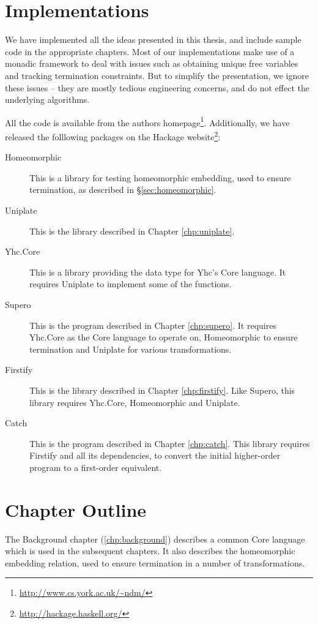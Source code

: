 \section{Implementations}

We have implemented all the ideas presented in this thesis, and include sample code in the appropriate chapters. Most of our implementations make use of a monadic framework to deal with issues such as obtaining unique free variables and tracking termination constraints. But to simplify the presentation, we ignore these issues -- they are mostly tedious engineering concerns, and do not effect the underlying algorithms.

All the code is available from the authors homepage\footnote{\url{http://www.cs.york.ac.uk/~ndm/}}. Additionally, we have released the folllowing packages on the Hackage website\footnote{\url{http://hackage.haskell.org/}}:

\begin{description}
\item[Homeomorphic] This is a library for testing homeomorphic embedding, used to ensure termination, as described in \S\ref{sec:homeomorphic}.
\item[Uniplate] This is the library described in Chapter \ref{chp:uniplate}.
\item[Yhc.Core] This is a library providing the data type for Yhc's Core language. It requires Uniplate to implement some of the functions.
\item[Supero] This is the program described in Chapter \ref{chp:supero}. It requires Yhc.Core as the Core language to operate on, Homeomorphic to ensure termination and Uniplate for various transformations.
\item[Firstify] This is the library described in Chapter \ref{chp:firstify}. Like Supero, this library requires Yhc.Core, Homeomorphic and Uniplate.
\item[Catch] This is the program described in Chapter \ref{chp:catch}. This library requires Firstify and all its dependencies, to convert the initial higher-order program to a first-order equivalent.
\end{description}

\section{Chapter Outline}

The Background chapter (\ref{chp:background}) describes a common Core language which is used in the subsequent chapters. It also describes the homeomorphic embedding relation, used to ensure termination in a number of transformations.

